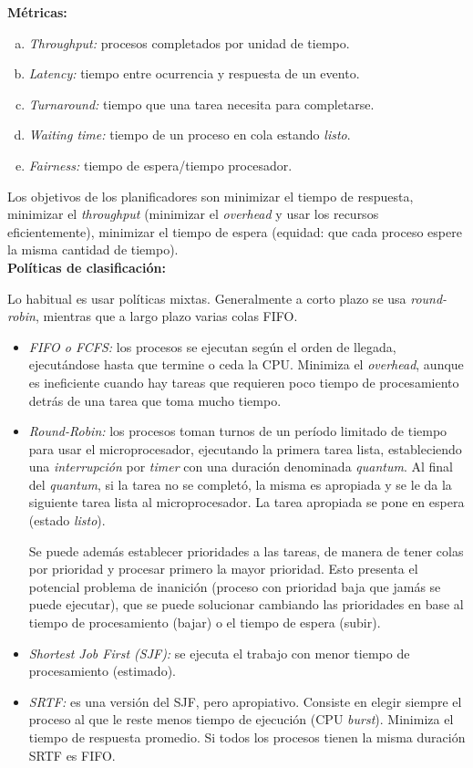 \documentclass[a4paper,10pt,spanish]{article}
\begin{document}
\textbf{Métricas:}

\begin{enumerate}[a.]
\item \textit{Throughput:} procesos completados por unidad de tiempo.
\item \textit{Latency:} tiempo entre ocurrencia y respuesta de un evento.
\item \textit{Turnaround:} tiempo que una tarea necesita para completarse.
\item \textit{Waiting time:} tiempo de un proceso en cola estando \textit{listo}.
\item \textit{Fairness:} tiempo de espera/tiempo procesador.
\end{enumerate}

Los objetivos de los planificadores son minimizar el tiempo de respuesta, minimizar el \textit{throughput} (minimizar el \textit{overhead} y usar los recursos eficientemente), minimizar el tiempo de espera (equidad: que cada proceso espere la misma cantidad de tiempo). \\

\textbf{Políticas de clasificación:}

Lo habitual es usar políticas mixtas. Generalmente a corto plazo se usa \textit{round-robin}, mientras que a largo plazo varias colas FIFO.

\begin{itemize}
\item \textit{FIFO o FCFS:} los procesos se ejecutan según el orden de llegada, ejecutándose hasta que termine o ceda la CPU. Minimiza el \textit{overhead}, aunque es ineficiente cuando hay tareas que requieren poco tiempo de procesamiento detrás de una tarea que toma mucho tiempo.

\item \textit{Round-Robin:} los procesos toman turnos de un período limitado de tiempo para usar el microprocesador, ejecutando la primera tarea lista, estableciendo una \textit{interrupción} por \textit{timer} con una duración denominada \textit{quantum}. Al final del \textit{quantum}, si la tarea no se completó, la misma es apropiada y se le da la siguiente tarea lista al microprocesador. La tarea apropiada se pone en espera (estado \textit{listo}).

Se puede además establecer prioridades a las tareas, de manera de tener colas por prioridad y procesar primero la mayor prioridad. Esto presenta el potencial problema de inanición (proceso con prioridad baja que jamás se puede ejecutar), que se puede solucionar cambiando las prioridades en base al tiempo de procesamiento (bajar) o el tiempo de espera (subir).

\item \textit{Shortest Job First (SJF):} se ejecuta el trabajo con menor tiempo de procesamiento (estimado).

\item \textit{SRTF:} es una versión del SJF, pero apropiativo. Consiste en elegir siempre el proceso al que le reste menos tiempo de ejecución (CPU \textit{burst}). Minimiza el tiempo de respuesta promedio. Si todos los procesos tienen la misma duración SRTF es FIFO.
\end{itemize}
\end{document}

